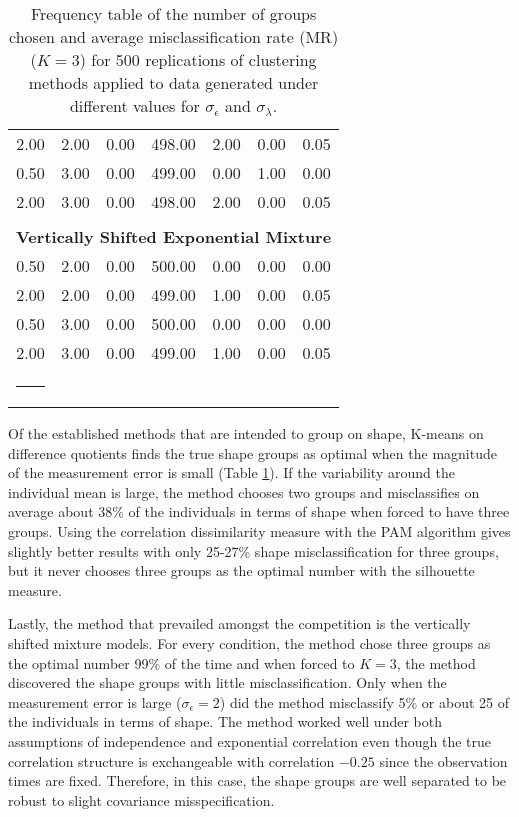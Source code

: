 \documentclass[12pt]{article}
\makeatletter
\newcommand{\thickhline}{%
    \noalign {\ifnum 0=`}\fi \hrule height 1.5pt
    \futurelet \reserved@a \@xhline
}
\makeatother
\begin{document}
\begin{table}[ht]
\begin{center}
\begin{tabular}{ccccccc}
  2.00 & 2.00 & 0.00 & 498.00 & 2.00 & 0.00 & 0.05 \\ 
  0.50 & 3.00 & 0.00 & 499.00 & 0.00 & 1.00 & 0.00 \\ 
  2.00 & 3.00 & 0.00 & 498.00 & 2.00 & 0.00 & 0.05 \\ 
   \\ \multicolumn{7}{c}{\textbf{Vertically Shifted Exponential Mixture}}\\0.50 & 2.00 & 0.00 & 500.00 & 0.00 & 0.00 & 0.00 \\ 
  2.00 & 2.00 & 0.00 & 499.00 & 1.00 & 0.00 & 0.05 \\ 
  0.50 & 3.00 & 0.00 & 500.00 & 0.00 & 0.00 & 0.00 \\ 
  2.00 & 3.00 & 0.00 & 499.00 & 1.00 & 0.00 & 0.05 \\ 
   \thickhline\end{tabular}
\caption{Frequency table of the number of groups chosen and average misclassification rate (MR) ($K=3$) for 500 replications of clustering methods applied to data generated under different values for $\sigma_{\epsilon}$ and $\sigma_{\lambda}$.}
\label{tab:freq1}
\end{center}
\end{table}

Of the established methods that are intended to group on shape, K-means on difference quotients finds the true shape groups as optimal when the magnitude of the measurement error is small (Table \ref{tab:freq1}). If the variability around the individual mean is large, the method chooses two groups and misclassifies on average about 38\% of the individuals in terms of shape when forced to have three groups. Using the correlation dissimilarity measure with the PAM algorithm gives slightly better results with only 25-27\% shape misclassification for three groups, but it never chooses three groups as the optimal number with the silhouette measure.

Lastly, the method that prevailed amongst the competition is the vertically shifted mixture models. For every condition, the method chose three groups as the optimal number 99\% of the time and when forced to $K=3$, the method discovered the shape groups with little misclassification. Only when the measurement error is large ($\sigma_{\epsilon}=2$) did the method misclassify 5\% or about 25 of the individuals in terms of shape. The method worked well under both assumptions of independence and exponential correlation even though the true correlation structure is exchangeable with correlation $-0.25$ since the observation times are fixed. Therefore, in this case, the shape groups are well separated to be robust to slight covariance misspecification.
\end{document}
